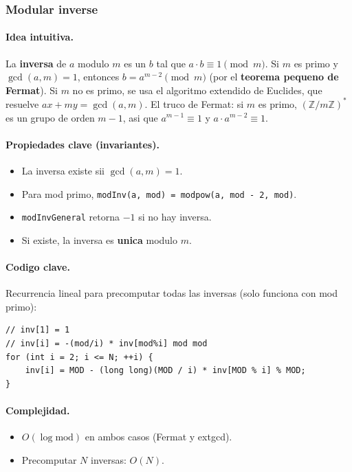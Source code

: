 ﻿\subsubsection{Modular inverse}

\paragraph{Idea intuitiva.}
La \textbf{inversa} de $a$ modulo $m$ es un $b$ tal que $a \cdot b \equiv 1 \pmod m$. Si $m$ es primo y $\gcd(a, m) = 1$, entonces $b = a^{m-2} \pmod m$ (por el \textbf{teorema pequeno de Fermat}). Si $m$ no es primo, se usa el algoritmo extendido de Euclides, que resuelve $ax + my = \gcd(a, m)$. El truco de Fermat: si $m$ es primo, $(\mathbb{Z}/m\mathbb{Z})^*$ es un grupo de orden $m - 1$, asi que $a^{m-1} \equiv 1$ y $a \cdot a^{m-2} \equiv 1$.

\paragraph{Propiedades clave (invariantes).}
\begin{itemize}\setlength\itemsep{0pt}
	\item La inversa existe sii $\gcd(a, m) = 1$.
	\item Para mod primo, \texttt{modInv(a, mod) = modpow(a, mod - 2, mod)}.
	\item \texttt{modInvGeneral} retorna $-1$ si no hay inversa.
	\item Si existe, la inversa es \textbf{unica} modulo $m$.
\end{itemize}

\paragraph{Codigo clave.}
Recurrencia lineal para precomputar todas las inversas (solo funciona con mod primo):
\begin{verbatim}
// inv[1] = 1
// inv[i] = -(mod/i) * inv[mod%i] mod mod
for (int i = 2; i <= N; ++i) {
    inv[i] = MOD - (long long)(MOD / i) * inv[MOD % i] % MOD;
}
\end{verbatim}

\paragraph{Complejidad.}
\begin{itemize}\setlength\itemsep{0pt}
	\item $O(\log \text{mod})$ en ambos casos (Fermat y extgcd).
	\item Precomputar $N$ inversas: $O(N)$.
\end{itemize}

